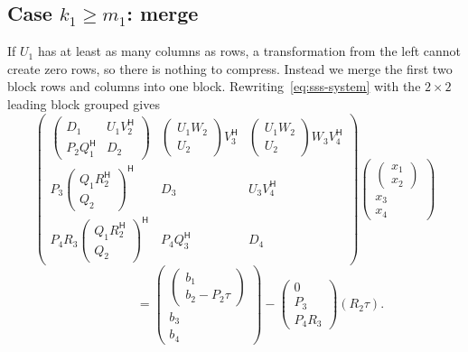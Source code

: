 \documentclass[11pt]{article}
\newcommand{\ct}{^{\mathsf H}}            %
\theoremstyle{definition}
\begin{document}
\subsection{\texorpdfstring{Case $k_1\geq m_1$: merge}{Case k1 >= m1: merge}}

If $U_1$ has at least as many columns as rows, a transformation from the left
cannot create zero rows, so there is nothing to compress. Instead we merge the
first two block rows and columns into one block. Rewriting~\eqref{eq:sss-system} with the
$2\times2$ leading block grouped gives
\[
\left(
\begin{array}{c|c|c}
\begin{pmatrix} D_1 & U_1V_2\ct\\ P_2Q_1\ct & D_2\end{pmatrix} &
\begin{pmatrix} U_1W_2\\ U_2\end{pmatrix}V_3\ct &
\begin{pmatrix} U_1W_2\\ U_2\end{pmatrix}W_3V_4\ct\\[10pt]\hline
P_3\begin{pmatrix} Q_1R_2\ct\\ Q_2\end{pmatrix}\ct & D_3 & U_3V_4\ct\\[10pt]\hline
P_4R_3\begin{pmatrix} Q_1R_2\ct\\ Q_2\end{pmatrix}\ct & P_4Q_3\ct & D_4
\end{array}
\right)
\left(\begin{array}{c} \begin{pmatrix}x_1\\x_2\end{pmatrix}\\[10pt]\hline x_3\\[10pt]\hline x_4\end{array}\right)
\]
\[
\qquad\qquad=
\left(\begin{array}{c} \begin{pmatrix}b_1\\ b_2-P_2\tau\end{pmatrix}\\[10pt]\hline b_3\\[10pt]\hline b_4\end{array}\right)
-
\left(\begin{array}{c} 0\\[2pt]\hline P_3\\[2pt]\hline P_4R_3\end{array}\right)(R_2\tau).
\]
\end{document}
